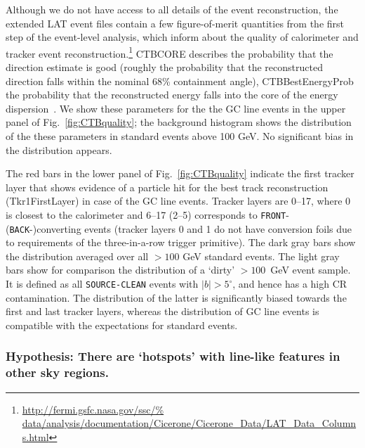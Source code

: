 \documentclass[aps,twocolumn,prd,superscriptaddress,showpacs,nofootinbib,fixfloat]{revtex4}
\begin{document}
Although we do not have access to all details of the event reconstruction, the
extended LAT event files contain a few figure-of-merit quantities from the first step of the
event-level analysis, which inform about the quality of
calorimeter and tracker event reconstruction.\footnote{\url{http://fermi.gsfc.nasa.gov/ssc/%
data/analysis/documentation/Cicerone/Cicerone\_Data/LAT\_Data\_Columns.html}}
CTBCORE describes the probability that the direction estimate
is good (roughly the probability that the reconstructed
direction falls within the nominal 68\% containment angle),
CTBBestEnergyProb the probability that the reconstructed
energy falls into the core of the energy
dispersion~\cite{collaboration:2012kca}. We show
these parameters for the the GC line events in the upper
panel of Fig.~\ref{fig:CTBquality}; the background histogram
shows the distribution of the these parameters in standard
events above 100 GeV. No significant bias in the distribution
appears.

The red bars in the lower panel of
Fig.~\ref{fig:CTBquality} indicate the first tracker layer that
shows evidence of a particle hit for the best track
reconstruction (Tkr1FirstLayer) in case of the GC line
events.  Tracker layers are 0--17, where 0 is closest to the
calorimeter and 6--17 (2--5) corresponds to \texttt{FRONT}-
(\texttt{BACK}-)converting events (tracker layers 0 and 1 do not have
conversion foils due to requirements of the three-in-a-row trigger
primitive). The dark gray bars show the
distribution averaged over all $>100$ GeV standard events.
The light gray bars
show for comparison the distribution of a `dirty' $>100$~GeV event sample.
It is defined as all \texttt{SOURCE-CLEAN} events with $|b|>5^\circ$,
and hence has a high
CR contamination. The distribution of the latter is significantly biased
towards the first and last tracker layers, whereas
the distribution of GC line events is compatible with the
expectations for standard events.

\subsubsection{Hypothesis: There are `hotspots' with
line-like features in other sky regions.}
\end{document}
